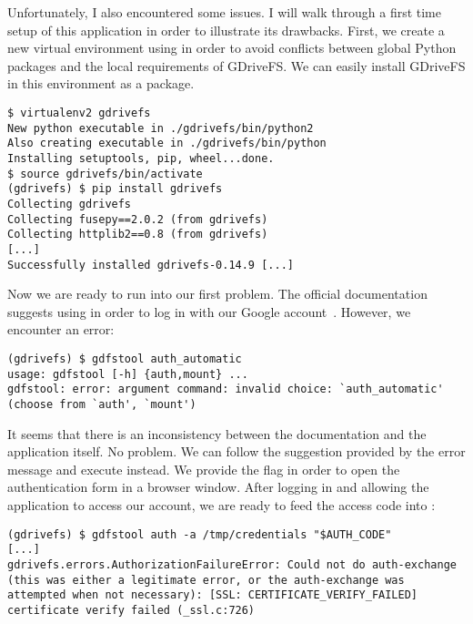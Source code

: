 Unfortunately, I also encountered some issues. I will walk through a first time setup of this application in order to illustrate its drawbacks. First, we create a new virtual environment using  in order to avoid conflicts between global Python packages and the local requirements of GDriveFS. We can easily install GDriveFS in this environment as a  package.

\begin{lstlisting}[basicstyle=\footnotesize\ttfamily,frame=single,caption=Creating a virtual environment and installing GDriveFS]
$ virtualenv2 gdrivefs
New python executable in ./gdrivefs/bin/python2
Also creating executable in ./gdrivefs/bin/python
Installing setuptools, pip, wheel...done.
$ source gdrivefs/bin/activate
(gdrivefs) $ pip install gdrivefs
Collecting gdrivefs
Collecting fusepy==2.0.2 (from gdrivefs)
Collecting httplib2==0.8 (from gdrivefs)
[...]
Successfully installed gdrivefs-0.14.9 [...]
\end{lstlisting}

Now we are ready to run into our first problem. The official documentation suggests using  in order to log in with our Google account~\cite{GDriveFS_README}. However, we encounter an error:

\begin{lstlisting}[basicstyle=\footnotesize\ttfamily,frame=single,caption=GDriveFS nonexistent authentication command]
(gdrivefs) $ gdfstool auth_automatic
usage: gdfstool [-h] {auth,mount} ...
gdfstool: error: argument command: invalid choice: `auth_automatic' (choose from `auth', `mount')
\end{lstlisting}

It seems that there is an inconsistency between the documentation and the application itself. No problem. We can follow the suggestion provided by the error message and execute  instead. We provide the  flag in order to open the authentication form in a browser window. After logging in and allowing the application to access our account, we are ready to feed the access code into :

\begin{lstlisting}[frame=single,caption=GDriveFS authentication error]
(gdrivefs) $ gdfstool auth -a /tmp/credentials "$AUTH_CODE"
[...]
gdrivefs.errors.AuthorizationFailureError: Could not do auth-exchange (this was either a legitimate error, or the auth-exchange was attempted when not necessary): [SSL: CERTIFICATE_VERIFY_FAILED] certificate verify failed (_ssl.c:726)
\end{lstlisting}

